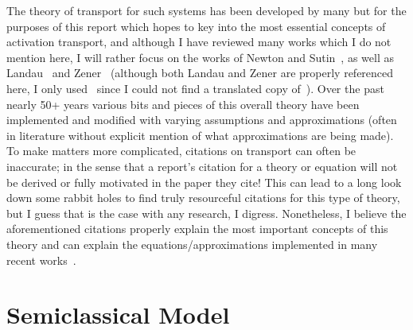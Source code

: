 The theory of transport for such systems has been developed by many but for the purposes of this report which hopes to key into the most essential concepts of activation transport, and although I have reviewed many works which I do not mention here, I will rather focus on the works of Newton and Sutin~\cite{brunschwig1980semiclassical}, as well as Landau~\cite{landau1932zur} and Zener~\cite{zener1932non} (although both Landau and Zener are properly referenced here, I only used~\cite{zener1932non} since I could not find a translated copy of~\cite{landau1932zur}). Over the past nearly 50+ years various bits and pieces of this overall theory have been implemented and modified with varying assumptions and approximations (often in literature without explicit mention of what approximations are being made). To make matters more complicated, citations on transport can often be inaccurate; in the sense that a report's citation for a theory or equation will not be derived or fully motivated in the paper they cite! This can lead to a long look down some rabbit holes to find truly resourceful citations for this type of theory, but I guess that is the case with any research, I digress. Nonetheless, I believe the aforementioned citations properly explain the most important concepts of this theory and can explain the equations/approximations implemented in many recent works~\cite{rosso2003an,deskins2007electron,oberhofer2012revisiting,gajdos2013inapplicability,blumberger2013constrained}.

\section{Semiclassical Model}

